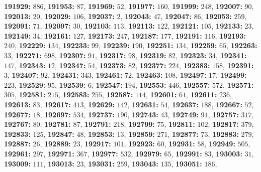 \textsf{\bfseries 191929:} $886$, \textsf{\bfseries 191953:} $87$, \textsf{\bfseries 191969:} $52$, \textsf{\bfseries 191977:} $160$, \textsf{\bfseries 191999:} $248$, \textsf{\bfseries 192007:} $90$, \textsf{\bfseries 192013:} $20$, \textsf{\bfseries 192029:} $106$, \textsf{\bfseries 192037:} $2$, \textsf{\bfseries 192043:} $47$, \textsf{\bfseries 192047:} $86$, \textsf{\bfseries 192053:} $259$, \textsf{\bfseries 192091:} $71$, \textsf{\bfseries 192097:} $30$, \textsf{\bfseries 192103:} $113$, \textsf{\bfseries 192113:} $122$, \textsf{\bfseries 192121:} $105$, \textsf{\bfseries 192133:} $23$, \textsf{\bfseries 192149:} $34$, \textsf{\bfseries 192161:} $127$, \textsf{\bfseries 192173:} $247$, \textsf{\bfseries 192187:} $177$, \textsf{\bfseries 192191:} $116$, \textsf{\bfseries 192193:} $240$, \textsf{\bfseries 192229:} $134$, \textsf{\bfseries 192233:} $99$, \textsf{\bfseries 192239:} $190$, \textsf{\bfseries 192251:} $134$, \textsf{\bfseries 192259:} $65$, \textsf{\bfseries 192263:} $33$, \textsf{\bfseries 192271:} $698$, \textsf{\bfseries 192307:} $91$, \textsf{\bfseries 192317:} $98$, \textsf{\bfseries 192319:} $82$, \textsf{\bfseries 192323:} $34$, \textsf{\bfseries 192341:} $147$, \textsf{\bfseries 192343:} $12$, \textsf{\bfseries 192347:} $54$, \textsf{\bfseries 192373:} $82$, \textsf{\bfseries 192377:} $224$, \textsf{\bfseries 192383:} $158$, \textsf{\bfseries 192391:} $3$, \textsf{\bfseries 192407:} $92$, \textsf{\bfseries 192431:} $343$, \textsf{\bfseries 192461:} $72$, \textsf{\bfseries 192463:} $108$, \textsf{\bfseries 192497:} $17$, \textsf{\bfseries 192499:} $223$, \textsf{\bfseries 192529:} $95$, \textsf{\bfseries 192539:} $6$, \textsf{\bfseries 192547:} $194$, \textsf{\bfseries 192553:} $446$, \textsf{\bfseries 192557:} $572$, \textsf{\bfseries 192571:} $305$, \textsf{\bfseries 192581:} $215$, \textsf{\bfseries 192583:} $255$, \textsf{\bfseries 192587:} $114$, \textsf{\bfseries 192601:} $61$, \textsf{\bfseries 192611:} $236$, \textsf{\bfseries 192613:} $83$, \textsf{\bfseries 192617:} $413$, \textsf{\bfseries 192629:} $142$, \textsf{\bfseries 192631:} $54$, \textsf{\bfseries 192637:} $188$, \textsf{\bfseries 192667:} $52$, \textsf{\bfseries 192677:} $18$, \textsf{\bfseries 192697:} $534$, \textsf{\bfseries 192737:} $190$, \textsf{\bfseries 192743:} $43$, \textsf{\bfseries 192749:} $91$, \textsf{\bfseries 192757:} $317$, \textsf{\bfseries 192767:} $80$, \textsf{\bfseries 192781:} $87$, \textsf{\bfseries 192791:} $218$, \textsf{\bfseries 192799:} $75$, \textsf{\bfseries 192811:} $102$, \textsf{\bfseries 192817:} $379$, \textsf{\bfseries 192833:} $125$, \textsf{\bfseries 192847:} $48$, \textsf{\bfseries 192853:} $13$, \textsf{\bfseries 192859:} $271$, \textsf{\bfseries 192877:} $73$, \textsf{\bfseries 192883:} $279$, \textsf{\bfseries 192887:} $26$, \textsf{\bfseries 192889:} $23$, \textsf{\bfseries 192917:} $101$, \textsf{\bfseries 192923:} $60$, \textsf{\bfseries 192931:} $58$, \textsf{\bfseries 192949:} $505$, \textsf{\bfseries 192961:} $297$, \textsf{\bfseries 192971:} $367$, \textsf{\bfseries 192977:} $532$, \textsf{\bfseries 192979:} $65$, \textsf{\bfseries 192991:} $83$, \textsf{\bfseries 193003:} $31$, \textsf{\bfseries 193009:} $111$, \textsf{\bfseries 193013:} $23$, \textsf{\bfseries 193031:} $259$, \textsf{\bfseries 193043:} $135$, \textsf{\bfseries 193051:} $186$, 
